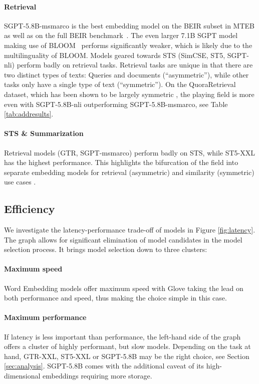 \documentclass[11pt]{article}
\begin{document}
\paragraph{Retrieval} SGPT-5.8B-msmarco is the best embedding model on the BEIR subset in MTEB as well as on the full BEIR benchmark~\cite{beir, muennighoff2022sgpt}. The even larger 7.1B SGPT model making use of BLOOM~\cite{scao2022bloom} performs significantly weaker, which is likely due to the multilinguality of BLOOM. Models geared towards STS (SimCSE, ST5, SGPT-nli) perform badly on retrieval tasks. Retrieval tasks are unique in that there are two distinct types of texts: Queries and documents (``asymmetric''), while other tasks only have a single type of text (``symmetric''). On the QuoraRetrieval dataset, which has been shown to be largely symmetric \cite{muennighoff2022sgpt}, the playing field is more even with SGPT-5.8B-nli outperforming SGPT-5.8B-msmarco, see Table \ref{tab:addresults}.

\paragraph{STS \& Summarization} Retrieval models (GTR, SGPT-msmarco) perform badly on STS, while ST5-XXL has the highest performance. This highlights the bifurcation of the field into separate embedding models for retrieval (asymmetric) and similarity (symmetric) use cases \cite{muennighoff2022sgpt}.

\subsection{Efficiency}
\label{sec:efficiency}

We investigate the latency-performance trade-off of models in Figure \ref{fig:latency}. The graph allows for significant elimination of model candidates in the model selection process. It brings model selection down to three clusters: 

\paragraph{Maximum speed} Word Embedding models offer maximum speed with Glove taking the lead on both performance and speed, thus making the choice simple in this case.

\paragraph{Maximum performance} If latency is less important than performance, the left-hand side of the graph offers a cluster of highly performant, but slow models. Depending on the task at hand, GTR-XXL, ST5-XXL or SGPT-5.8B may be the right choice, see Section \ref{sec:analysis}. SGPT-5.8B comes with the additional caveat of its high-dimensional embeddings requiring more storage.
\end{document}
